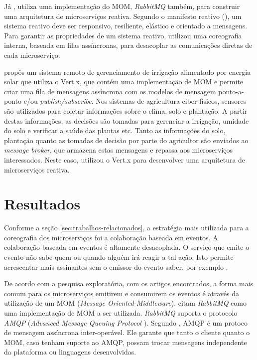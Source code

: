 \documentclass[12pt]{article}
\theoremstyle{plain}
\begin{document}
Já \cite{Brilhante:2017}, utiliza uma implementação do MOM, \textit{RabbitMQ} também, para construir uma arquitetura de microserviços reativa. Segundo o manifesto reativo (\cite{reactivemanifesto}), um sistema reativo deve ser responsivo, resiliente, elástico e orientado a mensagens. Para garantir as propriedades de um sistema reativo, \cite{Brilhante:2017} utilizou uma coreografia interna, baseada em filas assíncronas, para desacoplar as comunicações diretas de cada microserviço.  

\cite{Abdelouahed:2018} propôs um sistema remoto de gerenciamento de irrigação alimentado por energia solar que utiliza o Vert.x, que contém uma implementação de MOM e permite criar uma fila de mensagens assíncrona com os modelos de mensagem ponto-a-ponto e/ou \textit{publish/subscribe}. Nos sistemas de agricultura ciber-físicos, sensores são utilizados para coletar informações sobre o clima, solo e plantação. A partir destas informações, as decisões são tomadas para gerenciar a irrigação, umidade do solo e verificar a saúde das plantas etc. Tanto as informações do solo, plantação quanto as tomadas de decisão por parte do agricultor são enviados ao \textit{message broker}, que armazena estas mensagens e repassa aos microserviços interessados. Neste caso, \cite{Abdelouahed:2018} utilizou o Vert.x para desenvolver uma arquitetura de microserviços reativa.

\section{Resultados}
\label{sec:resultados}

Conforme a seção \ref{sec:trabalhos-relacionados}, a estratégia mais utilizada para a coreografia dos microserviços foi a colaboração baseada em eventos. A colaboração baseada em eventos é altamente desacoplada. O serviço que emite o evento não sabe quem ou quando alguém irá reagir a tal ação. Isto permite acrescentar mais assinantes sem o emissor do evento saber, por exemplo \cite{Newman:15}.

De acordo com a pesquisa exploratória, com os artigos encontrados, a forma mais comum para os microserviços emitirem e consumirem os eventos é através da utilização de um MOM (\textit{Message Oriented-Middleware}). \cite{Newman:15, Brilhante:2017, richter:2017} citam \textit{RabbitMQ} como uma implementação de MOM a ser utilizada. \textit{RabbitMQ} suporta o protocolo \emph{AMQP} (\textit{Advanced Message Queuing Protocol }). Segundo \cite{Vinoski:06}, AMQP é um protoco de mensagem assíncrona inter-operável. Ele garante que tanto o cliente quanto o MOM, caso tenham suporte ao AMQP, possam trocar mensagens independente da plataforma ou linguagens desenvolvidas.
\end{document}

